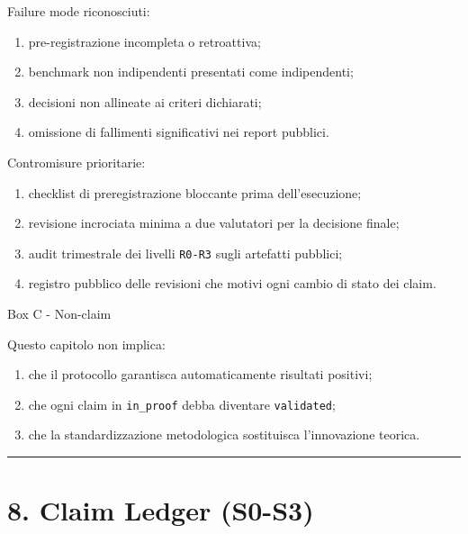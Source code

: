 Failure mode riconosciuti:

\begin{enumerate}
\def\labelenumi{\arabic{enumi}.}
\tightlist
\item
  pre-registrazione incompleta o retroattiva;
\item
  benchmark non indipendenti presentati come indipendenti;
\item
  decisioni non allineate ai criteri dichiarati;
\item
  omissione di fallimenti significativi nei report pubblici.
\end{enumerate}

Contromisure prioritarie:

\begin{enumerate}
\def\labelenumi{\arabic{enumi}.}
\tightlist
\item
  checklist di preregistrazione bloccante prima dell'esecuzione;
\item
  revisione incrociata minima a due valutatori per la decisione finale;
\item
  audit trimestrale dei livelli \texttt{R0-R3} sugli artefatti pubblici;
\item
  registro pubblico delle revisioni che motivi ogni cambio di stato dei claim.
\end{enumerate}

Box C - Non-claim

Questo capitolo non implica:

\begin{enumerate}
\def\labelenumi{\arabic{enumi}.}
\tightlist
\item
  che il protocollo garantisca automaticamente risultati positivi;
\item
  che ogni claim in \texttt{in\_proof} debba diventare \texttt{validated};
\item
  che la standardizzazione metodologica sostituisca l'innovazione teorica.
\end{enumerate}

\begin{center}\rule{0.5\linewidth}{0.5pt}\end{center}

\section{8. Claim Ledger (S0-S3)}


